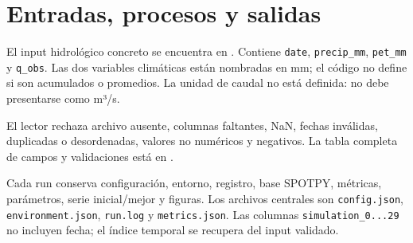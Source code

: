 \chapter{Entradas, procesos y salidas}
El input hidrológico concreto se encuentra en
. Contiene \texttt{date},
\texttt{precip\_mm}, \texttt{pet\_mm} y \texttt{q\_obs}. Las dos variables climáticas están nombradas en mm; el código no define si son acumulados o promedios. La unidad de caudal no está definida: no debe presentarse como m³/s.

El lector rechaza archivo ausente, columnas faltantes, NaN, fechas inválidas, duplicadas o desordenadas, valores no numéricos y negativos. La tabla completa de campos y validaciones está en .



Cada run conserva configuración, entorno, registro, base SPOTPY, métricas, parámetros, serie inicial/mejor y figuras. Los archivos centrales son \texttt{config.json}, \texttt{environment.json}, \texttt{run.log} y \texttt{metrics.json}. Las columnas \texttt{simulation\_0...29} no incluyen fecha; el índice temporal se recupera del input validado.
